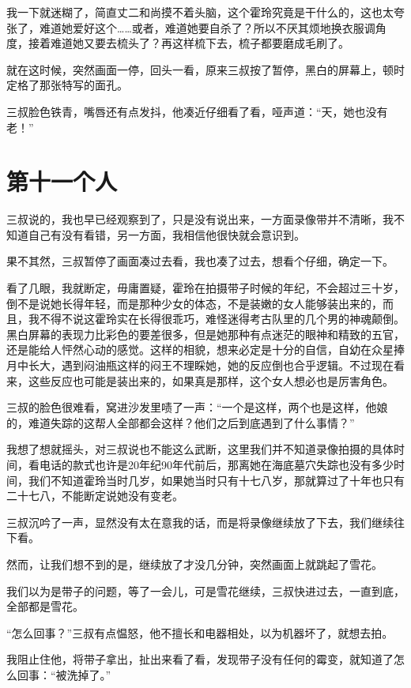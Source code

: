 我一下就迷糊了，简直丈二和尚摸不着头脑，这个霍玲究竟是干什么的，这也太夸张了，难道她爱好这个……或者，难道她要自杀了？所以不厌其烦地换衣服调角度，接着难道她又要去梳头了？再这样梳下去，梳子都要磨成毛刷了。

就在这时候，突然画面一停，回头一看，原来三叔按了暂停，黑白的屏幕上，顿时定格了那张特写的面孔。

三叔脸色铁青，嘴唇还有点发抖，他凑近仔细看了看，哑声道：“天，她也没有老！”

\chapter{第十一个人}

三叔说的，我也早已经观察到了，只是没有说出来，一方面录像带并不清晰，我不知道自己有没有看错，另一方面，我相信他很快就会意识到。

果不其然，三叔暂停了画面凑过去看，我也凑了过去，想看个仔细，确定一下。

看了几眼，我就断定，毋庸置疑，霍玲在拍摄带子时候的年纪，不会超过三十岁，倒不是说她长得年轻，而是那种少女的体态，不是装嫩的女人能够装出来的，而且，我不得不说这霍玲实在长得很乖巧，难怪迷得考古队里的几个男的神魂颠倒。黑白屏幕的表现力比彩色的要差很多，但是她那种有点迷茫的眼神和精致的五官，还是能给人怦然心动的感觉。这样的相貌，想来必定是十分的自信，自幼在众星捧月中长大，遇到闷油瓶这样的闷王不理睬她，她的反应倒也合乎逻辑。不过现在看来，这些反应也可能是装出来的，如果真是那样，这个女人想必也是厉害角色。

三叔的脸色很难看，窝进沙发里啧了一声：“一个是这样，两个也是这样，他娘的，难道失踪的这帮人全部都会这样？他们之后到底遇到了什么事情？”

我想了想就摇头，对三叔说也不能这么武断，这里我们并不知道录像拍摄的具体时间，看电话的款式也许是20年纪90年代前后，那离她在海底墓穴失踪也没有多少时间，我们不知道霍玲当时几岁，如果她当时只有十七八岁，那就算过了十年也只有二十七八，不能断定说她没有变老。

三叔沉吟了一声，显然没有太在意我的话，而是将录像继续放了下去，我们继续往下看。

然而，让我们想不到的是，继续放了才没几分钟，突然画面上就跳起了雪花。

我们以为是带子的问题，等了一会儿，可是雪花继续，三叔快进过去，一直到底，全部都是雪花。

“怎么回事？”三叔有点愠怒，他不擅长和电器相处，以为机器坏了，就想去拍。

我阻止住他，将带子拿出，扯出来看了看，发现带子没有任何的霉变，就知道了怎么回事：“被洗掉了。”


